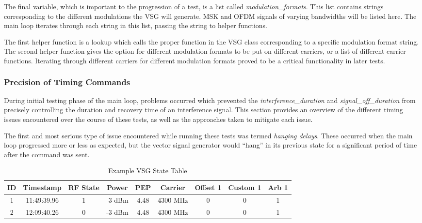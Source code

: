 The final variable, which is important to the progression of a test, is a list called \textit{modulation\_formats}.
This list contains strings corresponding to the different modulations the VSG will generate. MSK and OFDM signals of varying bandwidths will be listed here. The main loop iterates through each string in this list, passing the string to helper functions. 

The first helper function is a lookup which calls the proper function in the VSG class corresponding to a specific modulation format string. The second helper function gives the option for different modulation formats to be put on different carriers, or a list of different carrier functions. Iterating through different carriers for different modulation formats proved to be a critical functionality in later tests.


\subsubsection{Precision of Timing Commands}\label{subsub:timing}
During initial testing phase of the main loop, problems occurred which prevented the \textit{interference\_duration} and \textit{signal\_off\_duration} from precisely controlling the duration and recovery time of an interference signal. This section provides an overview of the different timing issues encountered over the course of these tests, as well as the approaches taken to mitigate each issue. 
 
The first and most serious type of issue encountered while running these tests was termed \textit{hanging delays}. These occurred when the main loop progressed more or less as expected, but the vector signal generator would ``hang'' in its previous state for a significant period of time after the command was sent. 



\begin{table}[]
\centering
\begin{tabular}{@{}ccccccccc@{}}
\toprule
ID & Timestamp   & RF State & Power  & PEP  & Carrier  & Offset 1 & Custom 1 & Arb 1 \\ \midrule
1  & 11:49:39.96 & 1        & -3 dBm & 4.48 & 4300 MHz & 0        & 0        & 1     \\
2  & 12:09:40.26 & 0        & -3 dBm & 4.48 & 4300 MHz & 0        & 0        & 1     \\ \bottomrule


\end{tabular}
\caption{Example VSG State Table}
\label{tab:VSG_State}
\end{table}
 

